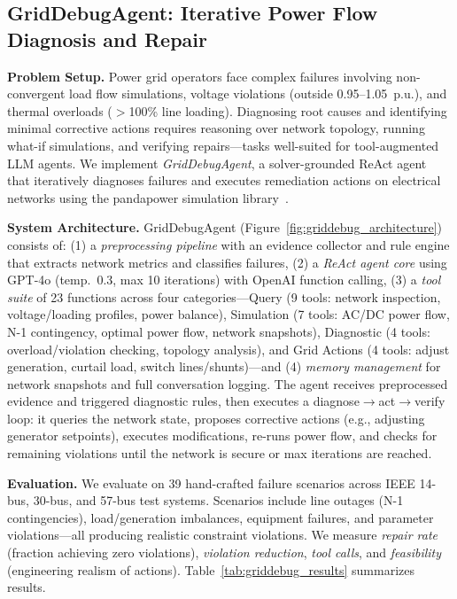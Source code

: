 
\subsection{GridDebugAgent: Iterative Power Flow Diagnosis and Repair}

\textbf{Problem Setup.}
Power grid operators face complex failures involving non-convergent load flow simulations, voltage violations (outside 0.95--1.05~p.u.), and thermal overloads ($>$100\% line loading). Diagnosing root causes and identifying minimal corrective actions requires reasoning over network topology, running what-if simulations, and verifying repairs---tasks well-suited for tool-augmented LLM agents. We implement \textit{GridDebugAgent}, a solver-grounded ReAct agent~\cite{yao2023react} that iteratively diagnoses failures and executes remediation actions on electrical networks using the pandapower simulation library~\cite{thurner2018pandapower}.

\textbf{System Architecture.}
GridDebugAgent (Figure~\ref{fig:griddebug_architecture}) consists of: (1) a \textit{preprocessing pipeline} with an evidence collector and rule engine that extracts network metrics and classifies failures, (2) a \textit{ReAct agent core} using GPT-4o (temp.\ 0.3, max 10 iterations) with OpenAI function calling, (3) a \textit{tool suite} of 23 functions across four categories---Query (9 tools: network inspection, voltage/loading profiles, power balance), Simulation (7 tools: AC/DC power flow, N-1 contingency, optimal power flow, network snapshots), Diagnostic (4 tools: overload/violation checking, topology analysis), and Grid Actions (4 tools: adjust generation, curtail load, switch lines/shunts)---and (4) \textit{memory management} for network snapshots and full conversation logging. The agent receives preprocessed evidence and triggered diagnostic rules, then executes a diagnose$\to$act$\to$verify loop: it queries the network state, proposes corrective actions (e.g., adjusting generator setpoints), executes modifications, re-runs power flow, and checks for remaining violations until the network is secure or max iterations are reached.

\textbf{Evaluation.}
We evaluate on 39 hand-crafted failure scenarios across IEEE 14-bus, 30-bus, and 57-bus test systems. Scenarios include line outages (N-1 contingencies), load/generation imbalances, equipment failures, and parameter violations---all producing realistic constraint violations. We measure \textit{repair rate} (fraction achieving zero violations), \textit{violation reduction}, \textit{tool calls}, and \textit{feasibility} (engineering realism of actions). Table~\ref{tab:griddebug_results} summarizes results.

